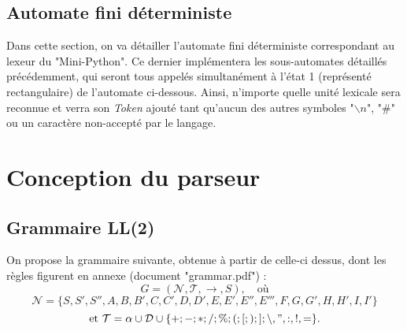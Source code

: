 \documentclass[a4paper, 12pt]{report}
\begin{document}
\newpage

\section{Automate fini déterministe}

Dans cette section, on va détailler l'automate fini déterministe correspondant au lexeur du "Mini-Python". Ce dernier implémentera les sous-automates détaillés précédemment, qui seront tous appelés simultanément à l'état 1 (représenté rectangulaire) de l'automate ci-dessous. Ainsi, n'importe quelle unité lexicale sera reconnue et verra son \textit{Token} ajouté tant qu'aucun des autres symboles "$\backslash n$", "$\#$" ou un caractère non-accepté par le langage.\\

\begin{center}\end{center}

\chapter{Conception du parseur}

\section{Grammaire LL(2)}

On propose la grammaire suivante, obtenue à partir de celle-ci dessus, dont les règles figurent en annexe (document "grammar.pdf") :
\[ G = ( \mathcal{N}, \mathcal{T}, \to, S), \quad \text{où}\]
\[  \mathcal{N} = \lbrace S,S',S'',A,B,B',C,C',D,D',E,E',E'',E''',F,G,G',H,H',I,I' \rbrace \]
\[ \text{et } \mathcal{T} = \alpha \cup \mathcal{D} \cup \lbrace +;-;*;/;\%;(;[;);];\backslash, ",:,!,=\rbrace.\]
\end{document}
